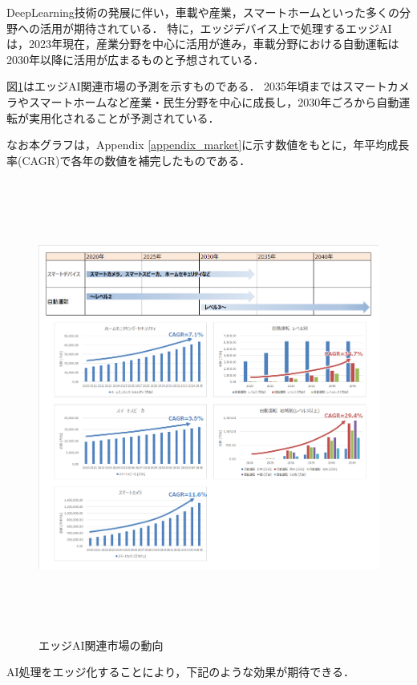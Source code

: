 DeepLearning技術の発展に伴い，車載や産業，スマートホームといった多くの分野への活用が期待されている．
特に，エッジデバイス上で処理するエッジAIは，2023年現在，産業分野を中心に活用が進み，車載分野における自動運転は2030年以降に活用が広まるものと予想されている．

図\ref{edge_ai_market}はエッジAI関連市場の予測を示すものである．
2035年頃まではスマートカメラやスマートホームなど産業・民生分野を中心に成長し，2030年ごろから自動運転が実用化されることが予測されている．

なお本グラフは，Appendix \ref{appendix_market}に示す数値をもとに，年平均成長率(CAGR)で各年の数値を補完したものである．

\begin{figure} [H]
	\begin{center}
		\includegraphics[clip, height=15cm, bb=-100 0 957 911]{data/figure/edge_ai_market.png}
		\caption{エッジAI関連市場の動向}
		\label{edge_ai_market}
	\end{center}
\end{figure}

AI処理をエッジ化することにより，下記のような効果が期待できる．

